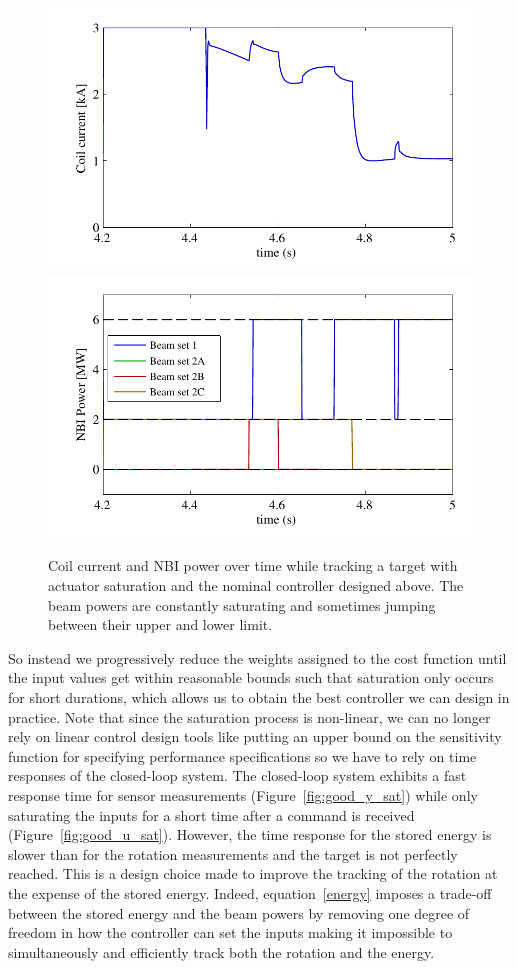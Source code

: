 \documentclass[12pt,lot, lof]{puthesis}
\begin{document}
\begin{figure}[htbp]
	\centering
	\includegraphics{chap10/fast_u_sat_aw_current}
	\includegraphics{chap10/fast_u_sat_aw_beams}
	\caption{Coil current and NBI power over time while tracking a target with actuator saturation and the nominal controller designed above.
		The beam powers are constantly saturating and sometimes jumping between their upper and lower limit.}
	\label{fig:best_u_sat}
\end{figure}


So instead we progressively reduce the weights assigned to the cost function until the input values get within reasonable bounds such that saturation only occurs for short durations, which allows us to obtain the best controller we can design in practice.
Note that since the saturation process is non-linear, we can no longer rely on linear control design tools like putting an upper bound on the sensitivity function for specifying performance specifications so we have to rely on time responses of the closed-loop system.
The closed-loop system exhibits a fast response time for sensor measurements (Figure~\ref{fig:good_y_sat}) while only saturating the inputs for a short time after a command is received (Figure~\ref{fig:good_u_sat}).
However, the time response for the stored energy is slower than for the rotation measurements and the target is not perfectly reached.
This is a design choice made to improve the tracking of the rotation at the expense of the stored energy.
Indeed, equation~\eqref{energy} imposes a trade-off between the stored energy and the beam powers by removing one degree of freedom in how the controller can set the inputs making it impossible to simultaneously and efficiently track both the rotation and the energy.
\end{document}
